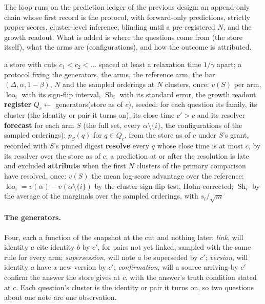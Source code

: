 \documentclass[11pt,a4paper]{article}
\theoremstyle{plain}
\theoremstyle{definition}
\theoremstyle{remark}
\DeclareMathOperator{\loo}{loo}
\DeclareMathOperator{\Sh}{Sh}
\begin{document}
The loop runs on the prediction ledger of the previous design: an append-only chain whose first
record is the protocol, with forward-only predictions, strictly proper scores, cluster-level
inference, blinding until a pre-registered $N$, and the growth readout. What is added is where the
questions come from (the store itself), what the arms are (configurations), and how the outcome is
attributed.

\begin{algorithm}[h]
\caption{The continuous evaluation loop, one round per cut.}
\begin{algorithmic}[1]
\Require a store with cuts $c_1 < c_2 < \dots$ spaced at least a relaxation time $1/\gamma$ apart; a
  protocol fixing the generators, the arms, the reference arm, the bar $(\Delta, \alpha, 1-\beta)$,
  $N$ and the sampled orderings
\Ensure at $N$ clusters, once: $v(S)$ per arm, $\loo_i$ with its sign-flip interval, $\Sh_i$ with
  its standard error, the growth readout
  \State \textbf{register} $Q_c \gets$ generators(store as of $c$), seeded: for each question its
    family, its cluster (the identity or pair it turns on), its close time $c' > c$ and its resolver
  \State \textbf{forecast} for each arm $S$ (the full set, every $\alpha \setminus \{i\}$, the
    configurations of the sampled orderings): $p_S(q)$ for $q \in Q_c$, from the store as of $c$
    under $S$'s grant, recorded with $S$'s pinned digest
  \State \textbf{resolve} every $q$ whose close time is at most $c$, by its resolver over the store
    as of $c$; a prediction at or after the resolution is late and excluded
  \State \textbf{attribute} when the first $N$ clusters of the primary comparison have resolved,
    once: $v(S)$ the mean log-score advantage over the reference; $\loo_i = v(\alpha) -
    v(\alpha\setminus\{i\})$ by the cluster sign-flip test, Holm-corrected; $\Sh_i$ by the average
    of the marginals over the sampled orderings, with $s_i/\sqrt m$
\EndFor
\end{algorithmic}
\end{algorithm}

\paragraph{The generators.}
Four, each a function of the snapshot at the cut and nothing later: \emph{link}, will identity $a$
cite identity $b$ by $c'$, for pairs not yet linked, sampled with the same rule for every arm;
\emph{supersession}, will note $a$ be superseded by $c'$; \emph{version}, will identity $a$ have a
new version by $c'$; \emph{confirmation}, will a source arriving by $c'$ confirm the answer the store
gives at $c$, with the answer's truth condition stated at $c$. Each question's cluster is the
identity or pair it turns on, so two questions about one note are one observation.
\end{document}
